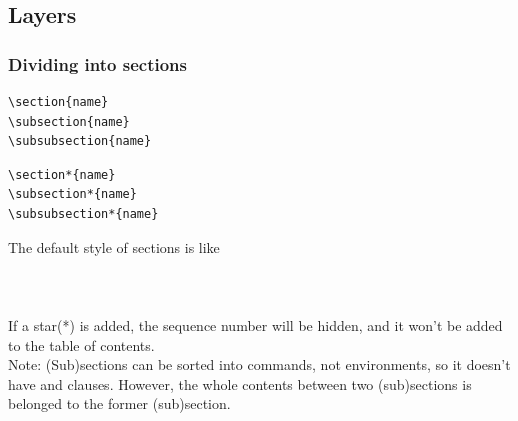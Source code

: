 \subsection{Layers}

\begin{frame}[fragile]
	\frametitle{Dividing into sections}
	\begin{command}
		\begin{multicols}{2}
			\begin{verbatim}
\section{name}
\subsection{name}
\subsubsection{name}
			\end{verbatim}
			\begin{verbatim}
\section*{name}
\subsection*{name}
\subsubsection*{name}
			\end{verbatim}
		\end{multicols}
		\vspace{-0.5em}
	\end{command}
	The default style of sections is like\\
	\\
	\\
	\\[0.5em]
	If a star(\alert{*}) is added, the sequence number will be hidden, and it won't be added to the table of contents.\\
	\alert{Note:} (Sub)sections can be sorted into commands, not environments, so it doesn't have \LC{\begin} and \LC{\end} clauses. However, the whole contents between two (sub)sections is belonged to the former (sub)section.
\end{frame}

